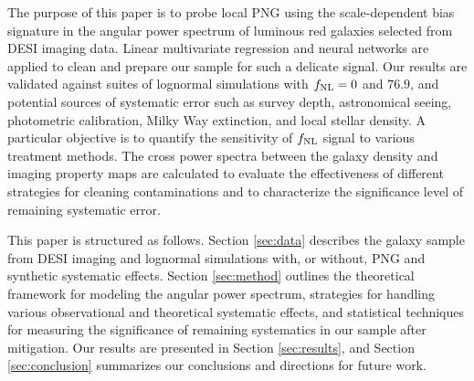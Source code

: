 The purpose of this paper is to probe local PNG using the scale-dependent bias signature in the angular power spectrum of luminous red galaxies selected from DESI imaging data. Linear multivariate regression and neural networks are applied to clean and prepare our sample for such a delicate signal. Our results are validated against suites of lognormal simulations with $f_{\rm NL}=0$ and $76.9$, and potential sources of systematic error such as survey depth, astronomical seeing, photometric calibration, Milky Way extinction, and local stellar density. A particular objective is to quantify the sensitivity of $f_{\rm NL}$ signal to various treatment methods. The cross power spectra between the galaxy density and imaging property maps are calculated to evaluate the effectiveness of different strategies for cleaning contaminations and to characterize the significance level of remaining systematic error. 

This paper is structured as follows. Section \ref{sec:data} describes the galaxy sample from DESI imaging and lognormal simulations with, or without, PNG and synthetic systematic effects. Section \ref{sec:method} outlines the theoretical framework for modeling the angular power spectrum, strategies for handling various observational and theoretical systematic effects, and statistical techniques for measuring the significance of remaining systematics in our sample after mitigation. Our results are presented in Section \ref{sec:results}, and Section \ref{sec:conclusion} summarizes our conclusions and directions for future work.